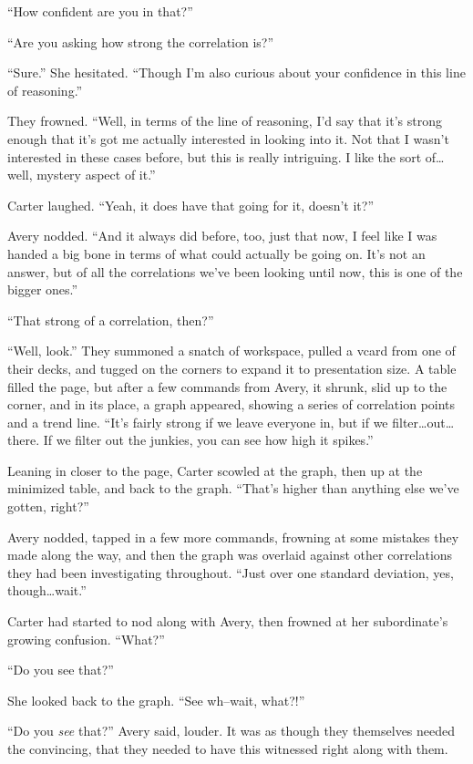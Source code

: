 ``How confident are you in that?''

``Are you asking how strong the correlation is?''

``Sure.'' She hesitated. ``Though I'm also curious about your confidence in this line of reasoning.''

They frowned. ``Well, in terms of the line of reasoning, I'd say that it's strong enough that it's got me actually interested in looking into it. Not that I wasn't interested in these cases before, but this is really intriguing. I like the sort of\ldots{}well, mystery aspect of it.''

Carter laughed. ``Yeah, it does have that going for it, doesn't it?''

Avery nodded. ``And it always did before, too, just that now, I feel like I was handed a big bone in terms of what could actually be going on. It's not an answer, but of all the correlations we've been looking until now, this is one of the bigger ones.''

``That strong of a correlation, then?''

``Well, look.'' They summoned a snatch of workspace, pulled a vcard from one of their decks, and tugged on the corners to expand it to presentation size. A table filled the page, but after a few commands from Avery, it shrunk, slid up to the corner, and in its place, a graph appeared, showing a series of correlation points and a trend line. ``It's fairly strong if we leave everyone in, but if we filter\ldots{}out\ldots{}there. If we filter out the junkies, you can see how high it spikes.''

Leaning in closer to the page, Carter scowled at the graph, then up at the minimized table, and back to the graph. ``That's higher than anything else we've gotten, right?''

Avery nodded, tapped in a few more commands, frowning at some mistakes they made along the way, and then the graph was overlaid against other correlations they had been investigating throughout. ``Just over one standard deviation, yes, though\ldots{}wait.''

Carter had started to nod along with Avery, then frowned at her subordinate's growing confusion. ``What?''

``Do you see that?''

She looked back to the graph. ``See wh--wait, what?!''

``Do you \emph{see} that?'' Avery said, louder. It was as though they themselves needed the convincing, that they needed to have this witnessed right along with them.

